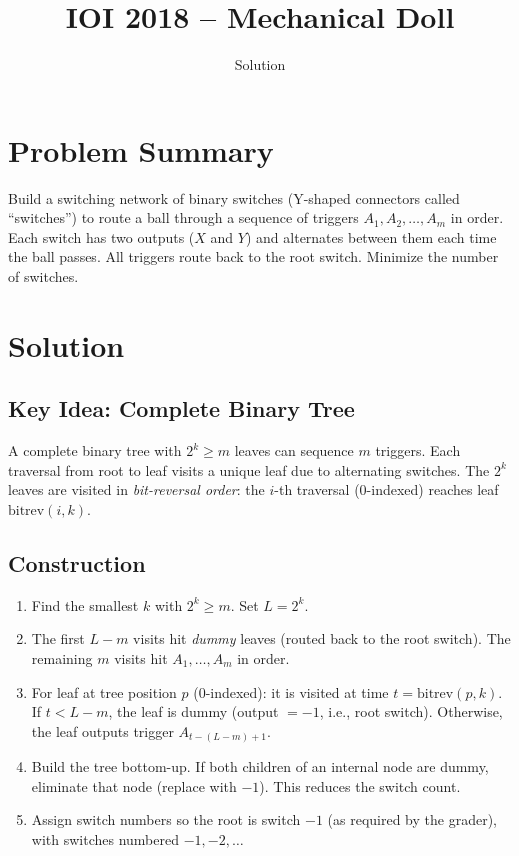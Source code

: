 \documentclass[11pt,a4paper]{article}
\title{IOI 2018 -- Mechanical Doll}
\author{Solution}
\date{}
\begin{document}
\maketitle

\section{Problem Summary}

Build a switching network of binary switches (Y-shaped connectors called ``switches'') to route a ball through a sequence of triggers $A_1, A_2, \ldots, A_m$ in order. Each switch has two outputs ($X$ and $Y$) and alternates between them each time the ball passes. All triggers route back to the root switch. Minimize the number of switches.

\section{Solution}

\subsection{Key Idea: Complete Binary Tree}

A complete binary tree with $2^k \ge m$ leaves can sequence $m$ triggers. Each traversal from root to leaf visits a unique leaf due to alternating switches. The $2^k$ leaves are visited in \emph{bit-reversal order}: the $i$-th traversal (0-indexed) reaches leaf $\text{bitrev}(i, k)$.

\subsection{Construction}

\begin{enumerate}
  \item Find the smallest $k$ with $2^k \ge m$. Set $L = 2^k$.
  \item The first $L - m$ visits hit \emph{dummy} leaves (routed back to the root switch). The remaining $m$ visits hit $A_1, \ldots, A_m$ in order.
  \item For leaf at tree position $p$ (0-indexed): it is visited at time $t = \text{bitrev}(p, k)$. If $t < L - m$, the leaf is dummy (output $= -1$, i.e., root switch). Otherwise, the leaf outputs trigger $A_{t - (L-m)+1}$.
  \item Build the tree bottom-up. If both children of an internal node are dummy, eliminate that node (replace with $-1$). This reduces the switch count.
  \item Assign switch numbers so the root is switch $-1$ (as required by the grader), with switches numbered $-1, -2, \ldots$
\end{enumerate}
\end{document}
